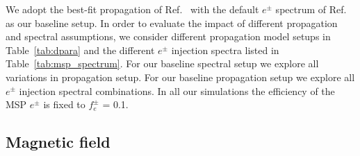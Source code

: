 \documentclass[doublespace,nopageskip]{VTthesis} %
\begin{document}
We adopt the best-fit propagation of Ref.~\cite{Johannesson:2016rlh} with the default $e^\pm$ spectrum of Ref.~\cite{Yuan:2014yda} as our baseline setup. In order to evaluate the impact of different propagation and spectral assumptions, we consider different propagation model setups in Table~\ref{tab:dpara} and the different $e^{\pm}$ injection spectra listed in Table~\ref{tab:msp_spectrum}. For our baseline spectral setup we explore all variations in propagation setup. For our baseline propagation setup we explore all $e^{\pm}$ injection spectral combinations. In all our simulations the efficiency of the MSP $e^\pm$ is fixed to $f_e^\pm$ = 0.1.

\subsection{Magnetic field}\label{sec:bfield}
\end{document}
